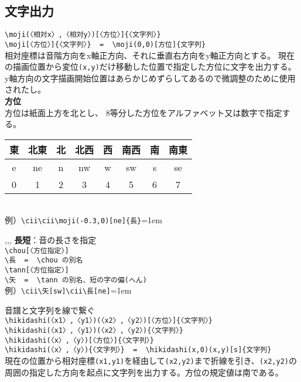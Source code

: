 \documentclass[a4paper,luatex]{l3doc}
\begin{document}
\subsection{文字出力}
\begin{function}{\moji}
 \verb|\moji(〈相対x〉,〈相対y〉)[〈方位〉]{〈文字列〉}|\\
 \verb|\moji[〈方位〉]{〈文字列〉}  =  \moji(0,0)[方位]{文字列}|\\
 相対座標は音階方向をx軸正方向、それに垂直右方向をy軸正方向とする。
 現在の描画位置から変位\verb|(x,y)|だけ移動した位置で指定した方位に文字を出力する。
 y軸方向の文字描画開始位置はあらかじめずらしてあるので微調整のために使用されたし。\\
\textbf{方位}\\
 方位は紙面上方を北とし、 8等分した方位をアルファベット又は数字で指定する。\\
 \begin{tabular}{|c|c|c|c|c|c|c|c|}\hline
  東&北東&北&北西&西&南西&南&南東\\\hline
  e&ne&n&nw&w&sw&s&se\\\hline
  0&1&2&3&4&5&6&7\\\hline
 \end{tabular}\\
 例）\verb|\cii\cii\moji(-0.3,0)[ne]{長}|\hspace{2em}\tanni=1em
\end{function}
\begin{function}{\chou,\長,\tann,\矢}
 \textbf{長短}：音の長さを指定\\
 \verb|\chou[〈方位指定〉]|\\
 \verb|\長  =  \chou の別名|\\
 \verb|\tann[〈方位指定〉]|\\
 \verb|\矢  =  \tann の別名、短の字の偏(へん)|\\
 例）\verb|\cii\矢[sw]\cii\長[ne]|\hspace{2em}\tanni=1em\hakase{\cii\矢[sw]\cii\長[ne]}
\end{function}

\begin{function}{\hikidashi}
音譜と文字列を線で繋ぐ\\
 \verb|\hikidashi(〈x1〉,〈y1〉)(〈x2〉,〈y2〉)[〈方位〉]{〈文字列〉}|\\
 \verb|\hikidashi(〈x1〉,〈y1〉)(〈x2〉,〈y2〉){〈文字列〉}|\\
 \verb|\hikidashi(〈x〉,〈y〉)[〈方位〉]{〈文字列〉}|\\
 \verb|\hikidashi(〈x〉,〈y〉){〈文字列〉}  =  \hikidashi(x,0)(x,y)[s]{文字列}|\\
現在の位置から相対座標\verb|(x1,y1)|を経由して\verb|(x2,y2)|まで折線を引き、\verb|(x2,y2)|の周囲の指定した方向を起点に文字列を出力する。方位の規定値は南である。
\end{function}
\end{document}
